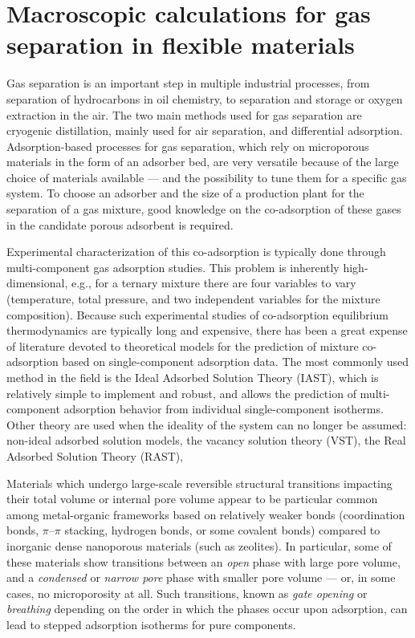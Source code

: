\documentclass[thesis]{subfiles}
\begin{document}
\newpage
\section{Macroscopic calculations for gas separation in flexible materials}

Gas separation is an important step in multiple industrial processes, from
separation of hydrocarbons in oil chemistry, to  separation and storage
or oxygen extraction in the air. The two main methods used for gas separation
are cryogenic distillation, mainly used for air separation, and differential
adsorption. Adsorption-based processes for gas separation, which rely on
microporous materials in the form of an adsorber bed, are very versatile because
of the large choice of materials available --- and the possibility to tune them
for a specific gas system. To choose an adsorber and the size of a production
plant for the separation of a gas mixture, good knowledge on the co-adsorption
of these gases in the candidate porous adsorbent is required.

Experimental characterization of this co-adsorption is typically done through
multi-component gas adsorption studies. This problem is inherently
high-dimensional, e.g., for a ternary mixture there are four variables to vary
(temperature, total pressure, and two independent variables for the mixture
composition). Because such experimental studies of co-adsorption equilibrium
thermodynamics are typically long and expensive, there has been a great expense
of literature devoted to theoretical models for the prediction of mixture
co-adsorption based on single-component adsorption data. The most commonly used
method in the field is the Ideal Adsorbed Solution Theory
(IAST)\cite{Myers1965}, which is relatively simple to implement and robust, and
allows the prediction of multi-component adsorption behavior from individual
single-component isotherms. Other theory are used when the ideality of the
system can no longer be assumed: non-ideal adsorbed solution
models\cite{Yang1987, Sweatman2002}, the vacancy solution theory
(VST)\cite{Suwanayuen1980}, the Real Adsorbed Solution Theory\cite{Talu1986}
(RAST), \etc

Materials which undergo large-scale reversible structural transitions impacting
their total volume or internal pore volume appear to be particular common among
metal-organic frameworks based on relatively weaker bonds (coordination bonds,
$\pi$--$\pi$ stacking, hydrogen bonds, or some covalent bonds) compared to
inorganic dense nanoporous materials (such as zeolites). In particular, some of
these materials show transitions between an \emph{open} phase with large pore
volume, and a \emph{condensed} or \emph{narrow pore} phase with smaller pore
volume --- or, in some cases, no microporosity at all. Such transitions, known
as \emph{gate opening}\cite{Kitaura2003, Tanaka2008, Li2015} or
\emph{breathing}\cite{Serre2002} depending on the order in which the phases
occur upon adsorption, can lead to stepped adsorption isotherms for pure
components.
\end{document}
